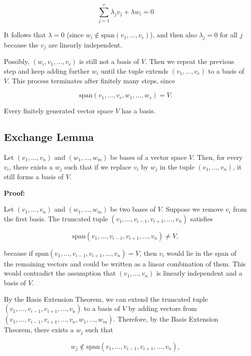 \[
	\sum_{j=1}^r \lambda_j v_j + \lambda w_i = 0
\]

It follows that \(\lambda = 0\) (since \(w_i \notin \text{span}(v_1, \ldots, v_r)\)), and then also 
\(\lambda_j = 0\) for all \(j\) because the \(v_j\) are linearly independent.

Possibly, \((w_i, v_1, \ldots, v_r)\) is still not a basis of \(V\). Then we repeat the previous step and 
keep adding further \(w_i\) until the tuple extends \((v_1, \ldots, v_r)\) to a basis of \(V\). This 
process terminates after finitely many steps, since

\[
	\text{span}(v_1, \ldots, v_r, w_1, \ldots, w_s) = V.
\]

\QED

Every finitely generated vector space \(V\) has a basis.

\subsection{Exchange Lemma}

Let \((v_1, \ldots, v_n)\) and \((w_1, \ldots, w_m)\) be bases of a vector space \(V\). Then, for every 
\(v_i\), there exists a \(w_j\) such that if we replace \(v_i\) by \(w_j\) in the tuple 
\((v_1, \ldots, v_n)\), it still forms a basis of \(V\).

\textbf{Proof:}

Let \((v_1, \ldots, v_n)\) and \((w_1, \ldots, w_m)\) be two bases of \(V\). Suppose we remove \(v_i\) 
from the first basis. The truncated tuple \((v_1, \ldots, v_{i-1}, v_{i+1}, \ldots, v_n)\) satisfies

\[
	\text{span}(v_1, \ldots, v_{i-1}, v_{i+1}, \ldots, v_n) \neq V,
\]

because if \(\text{span}(v_1, \ldots, v_{i-1}, v_{i+1}, \ldots, v_n) = V\), then \(v_i\) would lie in the 
span of the remaining vectors and could be written as a linear combination of them. This would contradict 
the assumption that \((v_1, \ldots, v_n)\) is linearly independent and a basis of \(V\).

By the Basis Extension Theorem, we can extend the truncated 
tuple \((v_1, \ldots, v_{i-1}, v_{i+1}, \ldots, v_n)\) to a basis of \(V\) by 
adding vectors from \((v_1, \ldots, v_{i-1}, v_{i+1}, \ldots, v_n, w_1, \ldots, w_m)\). 
Therefore, by the Basis Extension Theorem, there exists a \(w_j\) such that

\[
	w_j \notin \text{span}(v_1, \ldots, v_{i-1}, v_{i+1}, \ldots, v_n),
\]

